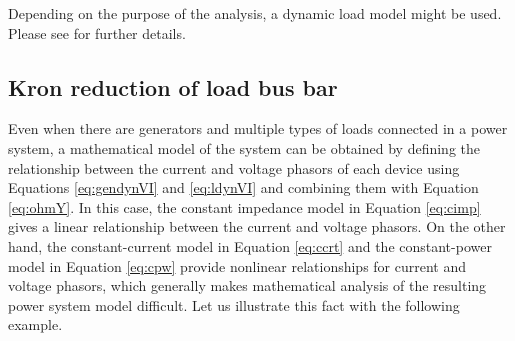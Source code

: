 \documentclass[graybox, envcountchap]{svmult}
\begin{document}
Depending on the purpose of the analysis, a dynamic load model might be used.
Please see \cite[Section 7.1.2]{kundur1994power} for further details.

\subsection{Kron reduction of load bus bar}

Even when there are generators and multiple types of loads connected in a power
system, a mathematical model of the system can be obtained by defining the
relationship between the current and voltage phasors of each device using
Equations \ref{eq:gendynVI} and \ref{eq:ldynVI} and combining them with Equation
\ref{eq:ohmY}. In this case, the constant impedance model in Equation
\ref{eq:cimp} gives a linear relationship between the current and voltage
phasors. On the other hand, the constant-current model in Equation \ref{eq:ccrt}
and the constant-power model in Equation \ref{eq:cpw} provide nonlinear
relationships for current and voltage phasors, which generally makes
mathematical analysis of the resulting power system model difficult. Let us
illustrate this fact with the following example.
\end{document}
